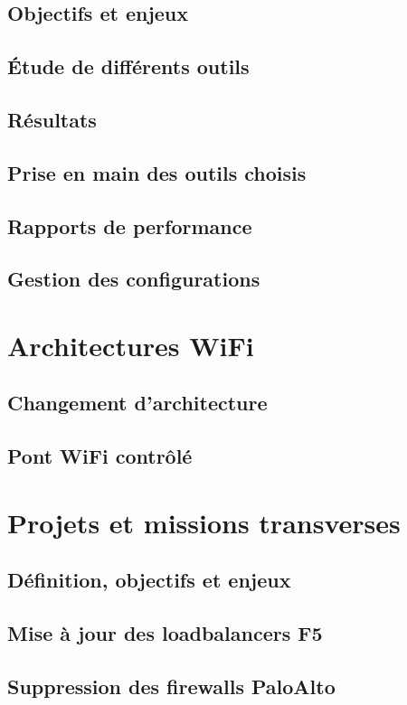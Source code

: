 \documentclass[a4paper,12pt]{report}
\begin{document}
\subsection{Objectifs et enjeux}
\subsection{Étude de différents outils}
\subsection{Résultats}
\subsection{Prise en main des outils choisis}
\subsection{Rapports de performance}
\subsection{Gestion des configurations}
\section{Architectures WiFi}
\subsection{Changement d'architecture}
\subsection{Pont WiFi contrôlé}\label{pont_wifi}
\section{Projets et missions transverses}
\subsection{Définition, objectifs et enjeux}
\subsection{Mise à jour des loadbalancers F5}
\subsection{Suppression des firewalls PaloAlto}
\end{document}
